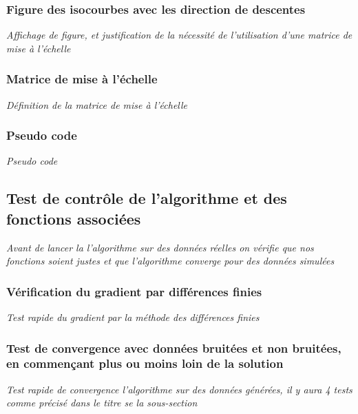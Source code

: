 \documentclass{article}
\begin{document}
\subsubsection{Figure des isocourbes avec les direction de descentes}
\textit{Affichage de figure, et justification de la nécessité de l'utilisation d'une matrice de mise à l'échelle}



\subsubsection{Matrice de mise à l'échelle}
\textit{Définition de la matrice de mise à l'échelle}



\subsubsection{Pseudo code}
\textit{Pseudo code}



\subsection{Test de contrôle de l'algorithme et des fonctions associées}
\textit{Avant de lancer la l'algorithme sur des données réelles on vérifie que nos fonctions soient justes et que l'algorithme converge pour des données simulées}

\subsubsection{Vérification du gradient par différences finies}
\textit{Test rapide du gradient par la méthode des différences finies}

\subsubsection{Test de convergence avec données bruitées et non bruitées, en commençant plus ou moins loin de la solution}
\textit{Test rapide de convergence l'algorithme sur des données générées, il y aura 4 tests comme précisé dans le titre se la sous-section}
\end{document}
